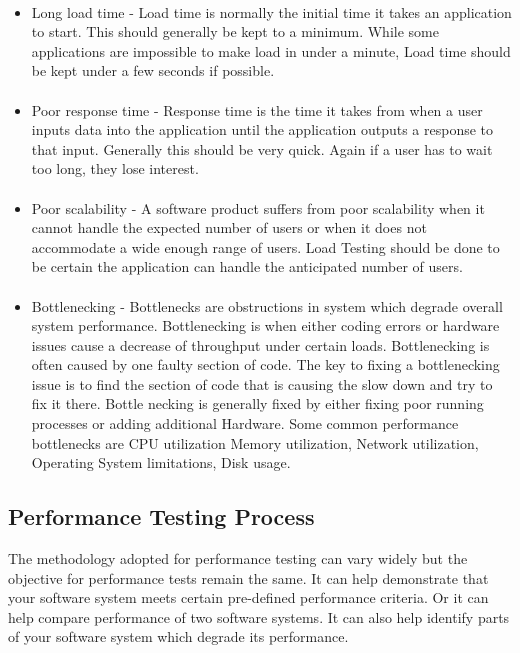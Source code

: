 \documentclass[../thesis.tex]{subfiles}
\begin{document}
\paragraph{}
\begin{itemize}
\item Long load time - Load time is normally the initial time it takes an application to start. This should generally be kept to a minimum. While some applications are impossible to make load in under a minute, Load time should be kept under a few seconds if possible.
\paragraph{}
\item Poor response time - Response time is the time it takes from when a user inputs data into the application until the application outputs a response to that input. Generally this should be very quick. Again if a user has to wait too long, they lose interest.
\paragraph{}
\item Poor scalability - A software product suffers from poor scalability when it cannot handle the expected number of users or when it does not accommodate a wide enough range of users. Load Testing should be done to be certain the application can handle the anticipated number of users.
\paragraph{}
\item Bottlenecking - Bottlenecks are obstructions in system which degrade overall system performance. Bottlenecking is when either coding errors or hardware issues cause a decrease of throughput under certain loads. Bottlenecking is often caused by one faulty section of code. The key to fixing a bottlenecking issue is to find the section of code that is causing the slow down and try to fix it there. Bottle necking is generally fixed by either fixing poor running processes or adding additional Hardware. Some common performance bottlenecks are CPU utilization
Memory utilization, Network utilization, Operating System limitations, Disk usage.
\end{itemize}
\subsection*{Performance Testing Process}
The methodology adopted for performance testing can vary widely but the objective for performance tests remain the same. It can help demonstrate that your software system meets certain pre-defined performance criteria. Or it can help compare performance of two software systems. It can also help identify parts of your software system which degrade its performance.
\end{document}
